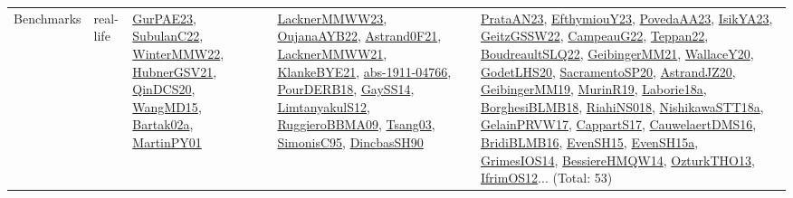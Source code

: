 {\begin{longtable}{lp{3cm}>{\raggedright}p{6cm}>{\raggedright}p{6cm}p{8cm}}
Benchmarks & real-life & \href{articles/GurPAE23.pdf}{GurPAE23}\cite{GurPAE23}, \href{articles/SubulanC22.pdf}{SubulanC22}\cite{SubulanC22}, \href{papers/WinterMMW22.pdf}{WinterMMW22}\cite{WinterMMW22}, \href{articles/HubnerGSV21.pdf}{HubnerGSV21}\cite{HubnerGSV21}, \href{articles/QinDCS20.pdf}{QinDCS20}\cite{QinDCS20}, \href{articles/WangMD15.pdf}{WangMD15}\cite{WangMD15}, \href{papers/Bartak02a.pdf}{Bartak02a}\cite{Bartak02a}, \href{articles/MartinPY01.pdf}{MartinPY01}\cite{MartinPY01} & \href{articles/LacknerMMWW23.pdf}{LacknerMMWW23}\cite{LacknerMMWW23}, \href{papers/OujanaAYB22.pdf}{OujanaAYB22}\cite{OujanaAYB22}, \href{papers/Astrand0F21.pdf}{Astrand0F21}\cite{Astrand0F21}, \href{papers/LacknerMMWW21.pdf}{LacknerMMWW21}\cite{LacknerMMWW21}, \href{papers/KlankeBYE21.pdf}{KlankeBYE21}\cite{KlankeBYE21}, \href{articles/abs-1911-04766.pdf}{abs-1911-04766}\cite{abs-1911-04766}, \href{articles/PourDERB18.pdf}{PourDERB18}\cite{PourDERB18}, \href{papers/GaySS14.pdf}{GaySS14}\cite{GaySS14}, \href{articles/LimtanyakulS12.pdf}{LimtanyakulS12}\cite{LimtanyakulS12}, \href{articles/RuggieroBBMA09.pdf}{RuggieroBBMA09}\cite{RuggieroBBMA09}, \href{articles/Tsang03.pdf}{Tsang03}\cite{Tsang03}, \href{papers/SimonisC95.pdf}{SimonisC95}\cite{SimonisC95}, \href{articles/DincbasSH90.pdf}{DincbasSH90}\cite{DincbasSH90} & \href{articles/PrataAN23.pdf}{PrataAN23}\cite{PrataAN23}, \href{papers/EfthymiouY23.pdf}{EfthymiouY23}\cite{EfthymiouY23}, \href{papers/PovedaAA23.pdf}{PovedaAA23}\cite{PovedaAA23}, \href{articles/IsikYA23.pdf}{IsikYA23}\cite{IsikYA23}, \href{papers/GeitzGSSW22.pdf}{GeitzGSSW22}\cite{GeitzGSSW22}, \href{articles/CampeauG22.pdf}{CampeauG22}\cite{CampeauG22}, \href{papers/Teppan22.pdf}{Teppan22}\cite{Teppan22}, \href{papers/BoudreaultSLQ22.pdf}{BoudreaultSLQ22}\cite{BoudreaultSLQ22}, \href{papers/GeibingerMM21.pdf}{GeibingerMM21}\cite{GeibingerMM21}, \href{articles/WallaceY20.pdf}{WallaceY20}\cite{WallaceY20}, \href{papers/GodetLHS20.pdf}{GodetLHS20}\cite{GodetLHS20}, \href{articles/SacramentoSP20.pdf}{SacramentoSP20}\cite{SacramentoSP20}, \href{articles/AstrandJZ20.pdf}{AstrandJZ20}\cite{AstrandJZ20}, \href{papers/GeibingerMM19.pdf}{GeibingerMM19}\cite{GeibingerMM19}, \href{papers/MurinR19.pdf}{MurinR19}\cite{MurinR19}, \href{papers/Laborie18a.pdf}{Laborie18a}\cite{Laborie18a}, \href{articles/BorghesiBLMB18.pdf}{BorghesiBLMB18}\cite{BorghesiBLMB18}, \href{papers/RiahiNS018.pdf}{RiahiNS018}\cite{RiahiNS018}, \href{papers/NishikawaSTT18a.pdf}{NishikawaSTT18a}\cite{NishikawaSTT18a}, \href{papers/GelainPRVW17.pdf}{GelainPRVW17}\cite{GelainPRVW17}, \href{papers/CappartS17.pdf}{CappartS17}\cite{CappartS17}, \href{papers/CauwelaertDMS16.pdf}{CauwelaertDMS16}\cite{CauwelaertDMS16}, \href{articles/BridiBLMB16.pdf}{BridiBLMB16}\cite{BridiBLMB16}, \href{papers/EvenSH15.pdf}{EvenSH15}\cite{EvenSH15}, \href{articles/EvenSH15a.pdf}{EvenSH15a}\cite{EvenSH15a}, \href{articles/GrimesIOS14.pdf}{GrimesIOS14}\cite{GrimesIOS14}, \href{papers/BessiereHMQW14.pdf}{BessiereHMQW14}\cite{BessiereHMQW14}, \href{articles/OzturkTHO13.pdf}{OzturkTHO13}\cite{OzturkTHO13}, \href{papers/IfrimOS12.pdf}{IfrimOS12}\cite{IfrimOS12}... (Total: 53)\\

\end{longtable}}
